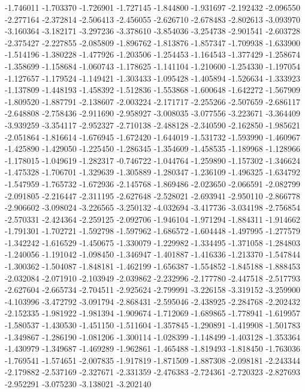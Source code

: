-1.746011
-1.703370
-1.726901
-1.727145
-1.844800
-1.931697
-2.192432
-2.096550
-2.277164
-2.372814
-2.506413
-2.456055
-2.626710
-2.678483
-2.802613
-3.093970
-3.160364
-3.182171
-3.297236
-3.378610
-3.854036
-3.254738
-2.901541
-2.603728
-2.375427
-2.227855
-2.085809
-1.896762
-1.813876
-1.857347
-1.709938
-1.633900
-1.514196
-1.380228
-1.477926
-1.203506
-1.254453
-1.164543
-1.377429
-1.258674
-1.358699
-1.158684
-1.060743
-1.178625
-1.141104
-1.210600
-1.254330
-1.197054
-1.127657
-1.179524
-1.149421
-1.303433
-1.095428
-1.405894
-1.526634
-1.333923
-1.137809
-1.448193
-1.458392
-1.512836
-1.553868
-1.600648
-1.642272
-1.567909
-1.809520
-1.887791
-2.138607
-2.003224
-2.171717
-2.255266
-2.507659
-2.686117
-2.648808
-2.758436
-2.911690
-2.958927
-3.008035
-3.077556
-3.223671
-3.364409
-3.939259
-3.354117
-2.952327
-2.710138
-2.488128
-2.340590
-2.162850
-1.985621
-2.051864
-1.816614
-1.676945
-1.672420
-1.644019
-1.531732
-1.593990
-1.460967
-1.425890
-1.429050
-1.225450
-1.286345
-1.354609
-1.458535
-1.189968
-1.128966
-1.178015
-1.049619
-1.282317
-0.746722
-1.044764
-1.259890
-1.157302
-1.346624
-1.475328
-1.706701
-1.329639
-1.305889
-1.280347
-1.236109
-1.496325
-1.634792
-1.547959
-1.765732
-1.672936
-2.145768
-1.869486
-2.023650
-2.066591
-2.082799
-2.091805
-2.216447
-2.311195
-2.627648
-2.528021
-2.693941
-2.950110
-2.866778
-2.906602
-3.098024
-3.226565
-3.250132
-4.032694
-3.417736
-3.034198
-2.756854
-2.570331
-2.424364
-2.259125
-2.092706
-1.946104
-1.971294
-1.884311
-1.914662
-1.791301
-1.702721
-1.592798
-1.597962
-1.686572
-1.604448
-1.497995
-1.277579
-1.342242
-1.616529
-1.450675
-1.330079
-1.229982
-1.334495
-1.371058
-1.284803
-1.240056
-1.191042
-1.098450
-1.346947
-1.401887
-1.416336
-1.213370
-1.547844
-1.300362
-1.504087
-1.848181
-1.462199
-1.656387
-1.554852
-1.845188
-1.888453
-2.032084
-2.071910
-2.103949
-2.039862
-2.232996
-2.177780
-2.447518
-2.517793
-2.627604
-2.665734
-2.704511
-2.925624
-2.799991
-3.226158
-3.319152
-3.259900
-4.103996
-3.472792
-3.091794
-2.868431
-2.595046
-2.438925
-2.284768
-2.202432
-2.152335
-1.981922
-1.981394
-1.909674
-1.712069
-1.689865
-1.778941
-1.619957
-1.580537
-1.430530
-1.451150
-1.511604
-1.357845
-1.290891
-1.419908
-1.501783
-1.349867
-1.286190
-1.081206
-1.300114
-1.028399
-1.148499
-1.403128
-1.353364
-1.430979
-1.349687
-1.469289
-1.962861
-1.465488
-1.819493
-1.818450
-1.763036
-1.769541
-1.574651
-2.007835
-1.917819
-1.871509
-1.887308
-2.098181
-2.243344
-2.179882
-2.537169
-2.327671
-2.331359
-2.476383
-2.724361
-2.720323
-2.827693
-2.952291
-3.075230
-3.138021
-3.202140
